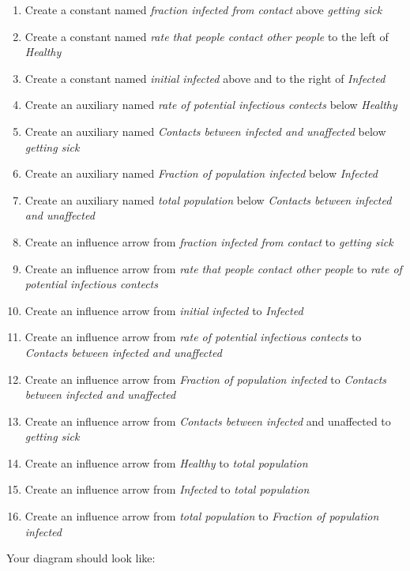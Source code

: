 \documentclass[11pt]{amsart}
\begin{document}
\begin{enumerate}
\item Create a constant named \textit{fraction infected from contact} above  \textit{getting sick}
\item Create a constant named \textit{rate that people contact other people} to the left of \textit{Healthy}
\item Create a constant named \textit{initial infected} above and to the right of \textit{Infected}
\item Create an auxiliary named \textit{rate of potential infectious contects} below \textit{Healthy}
\item Create an auxiliary named \textit{Contacts between infected and unaffected} below \textit{getting sick}
\item Create an auxiliary named \textit{Fraction of population infected} below \textit{Infected}
\item Create an auxiliary named \textit{total population} below \textit{Contacts between infected and unaffected}
\item Create an influence arrow from \textit{fraction infected from contact} to \textit{getting sick}
\item Create an influence arrow from \textit{rate that people contact other people} to \textit{rate of potential infectious contects}
\item Create an influence arrow from \textit{initial infected} to \textit{Infected}
\item Create an influence arrow from \textit{rate of potential infectious contects} to \textit{Contacts between infected and unaffected}
\item Create an influence arrow from \textit{Fraction of population infected} to \textit{Contacts between infected and unaffected}
\item Create an influence arrow from \textit{Contacts between infected} and unaffected to \textit{getting sick}
\item Create an influence arrow from \textit{Healthy} to \textit{total population}
\item Create an influence arrow from \textit{Infected} to \textit{total population}
\item Create an influence arrow from \textit{total population} to \textit{Fraction of population infected}
\end{enumerate}
\vspace{.2in}

Your diagram should look like:
\end{document}
